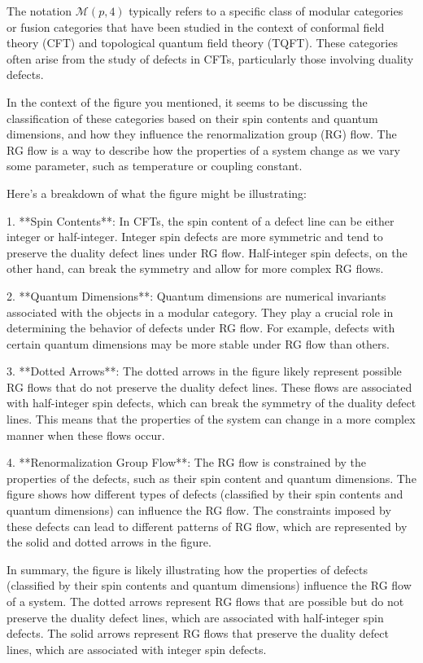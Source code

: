The notation \(\mathcal{M}(p, 4)\) typically refers to a specific class of modular categories or fusion categories that have been studied in the context of conformal field theory (CFT) and topological quantum field theory (TQFT). These categories often arise from the study of defects in CFTs, particularly those involving duality defects.

In the context of the figure you mentioned, it seems to be discussing the classification of these categories based on their spin contents and quantum dimensions, and how they influence the renormalization group (RG) flow. The RG flow is a way to describe how the properties of a system change as we vary some parameter, such as temperature or coupling constant.

Here's a breakdown of what the figure might be illustrating:

1. **Spin Contents**: In CFTs, the spin content of a defect line can be either integer or half-integer. Integer spin defects are more symmetric and tend to preserve the duality defect lines under RG flow. Half-integer spin defects, on the other hand, can break the symmetry and allow for more complex RG flows.

2. **Quantum Dimensions**: Quantum dimensions are numerical invariants associated with the objects in a modular category. They play a crucial role in determining the behavior of defects under RG flow. For example, defects with certain quantum dimensions may be more stable under RG flow than others.

3. **Dotted Arrows**: The dotted arrows in the figure likely represent possible RG flows that do not preserve the duality defect lines. These flows are associated with half-integer spin defects, which can break the symmetry of the duality defect lines. This means that the properties of the system can change in a more complex manner when these flows occur.

4. **Renormalization Group Flow**: The RG flow is constrained by the properties of the defects, such as their spin content and quantum dimensions. The figure shows how different types of defects (classified by their spin contents and quantum dimensions) can influence the RG flow. The constraints imposed by these defects can lead to different patterns of RG flow, which are represented by the solid and dotted arrows in the figure.

In summary, the figure is likely illustrating how the properties of defects (classified by their spin contents and quantum dimensions) influence the RG flow of a system. The dotted arrows represent RG flows that are possible but do not preserve the duality defect lines, which are associated with half-integer spin defects. The solid arrows represent RG flows that preserve the duality defect lines, which are associated with integer spin defects.